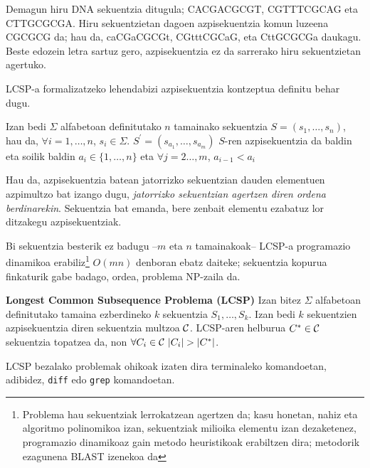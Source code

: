 \documentclass[eu]{ifirak}\usepackage[]{graphicx}\usepackage[]{color}
\begin{document}
\begin{tcolorbox}
\begin{ifexample}
Demagun hiru DNA sekuentzia ditugula; CACGACGCGT, CGTTTCGCAG eta CTTGCGCGA. Hiru sekuentzietan dagoen azpisekuentzia komun luzeena CGCGCG da; hau da, caCGaCGCGt, CGtttCGCaG, eta CttGCGCGa daukagu. Beste edozein letra sartuz gero, azpisekuentzia ez da sarrerako hiru sekuentzietan agertuko.
\end{ifexample}
\end{tcolorbox}

LCSP-a formalizatzeko lehendabizi azpisekuentzia kontzeptua definitu behar dugu.

\begin{ifdefinition}
Izan bedi $\Sigma$ alfabetoan definitutako $n$ tamainako sekuentzia $S=(s_1,\ldots,s_n)$, hau da, $\forall i=1,\ldots,n$, $s_i\in \Sigma$. $S^\prime=(s_{a_1},\ldots,s_{a_m})$ $S$-ren azpisekuentzia da baldin eta soilik baldin $a_i\in\{1,\ldots,n\}$ eta $\forall j=2\ldots,m$, $a_{i-1}<a_i$
\end{ifdefinition}

Hau da, azpisekuentzia batean jatorrizko sekuentzian dauden elementuen azpimultzo bat izango dugu, \textit{jatorrizko sekuentzian agertzen diren ordena berdinarekin}. Sekuentzia bat emanda, bere zenbait elementu ezabatuz lor ditzakegu azpisekuentziak.

Bi sekuentzia besterik ez badugu --$m$ eta $n$ tamainakoak-- LCSP-a programazio dinamikoa erabiliz\footnote{Problema hau sekuentziak lerrokatzean agertzen da; kasu honetan, nahiz eta algoritmo polinomikoa izan, sekuentziak milioika elementu izan dezaketenez, programazio dinamikoaz gain metodo heuristikoak erabiltzen dira; metodorik ezagunena BLAST\citep{altschul1990} izenekoa da} $O(mn)$ denboran ebatz daiteke; sekuentzia kopurua finkaturik gabe badago, ordea, problema NP-zaila da.

\begin{ifdefinition}{\bf Longest Common Subsequence Problema (LCSP)}
Izan bitez $\Sigma$ alfabetoan definitutako tamaina ezberdineko $k$ sekuentzia $S_1,\ldots,S_k$. Izan bedi $k$ sekuentzien azpisekuentzia diren sekuentzia multzoa $\cal C$. LCSP-aren helburua $C^*\in{\cal C}$ sekuentzia topatzea da, non $\forall C_i\in{\cal C}\ |C_i|>|C^*|$.
\end{ifdefinition}

LCSP bezalako problemak ohikoak izaten dira terminaleko komandoetan, adibidez, \texttt{diff} edo \texttt{grep} komandoetan.
\end{document}
